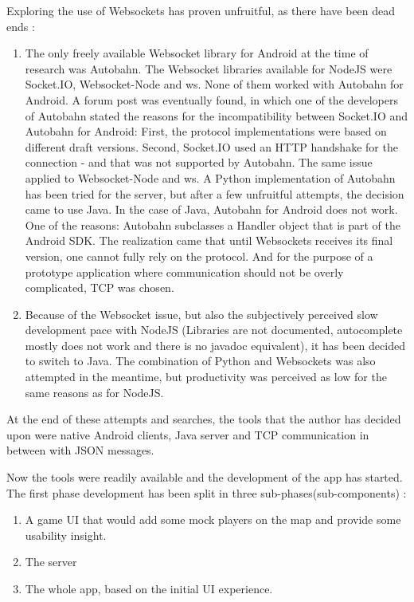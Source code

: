 Exploring the use of Websockets has proven unfruitful, as there have been dead
ends :
\begin{enumerate}
  \item The only freely available Websocket library for Android at the time of
  research was Autobahn. The Websocket libraries available for NodeJS were
  Socket.IO, Websocket-Node and ws. None of them worked with Autobahn for
  Android. A forum post was eventually found, in which one of the developers of
  Autobahn stated the reasons for the incompatibility between Socket.IO and
  Autobahn for Android: First, the protocol implementations were based on
  different draft versions. Second, Socket.IO used an HTTP handshake for the
  connection - and that was not supported by Autobahn. The same issue applied to
  Websocket-Node and ws. A Python implementation of Autobahn has been tried for
  the server, but after a few unfruitful attempts, the decision came to use
  Java. In the case of Java, Autobahn for Android does not work. One of the
  reasons: Autobahn subclasses a Handler object that is part of the Android
  SDK. The realization came that until Websockets receives its final version,
  one cannot fully rely on the protocol. And for the purpose of a prototype
  application where communication should not be overly complicated, TCP was
  chosen.
  
  \item Because of the Websocket issue, but also the subjectively perceived slow
  development pace with NodeJS (Libraries are not documented, autocomplete
  mostly does not work and there is no javadoc equivalent), it has been decided
  to switch to Java. The combination of Python  and Websockets was also
  attempted in the meantime, but productivity was perceived as low for the same
  reasons as for NodeJS.
\end{enumerate}

At the end of these attempts and searches, the tools that the author has decided
upon were native Android clients, Java server and TCP communication in between
with JSON messages.\newline

Now the tools were readily available and the development of the app has started.
The first phase development has been split in three sub-phases(sub-components) :
\begin{enumerate}
  \item A game UI that would add some mock players on the map and provide some
  usability insight.
  \item The server
  \item The whole app, based on the initial UI experience.
\end{enumerate}

